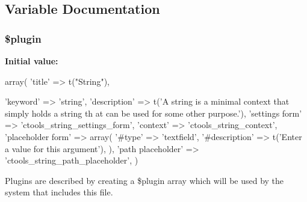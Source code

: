\subsection{Variable Documentation}
\hypertarget{arguments_2string_8inc_ada8a7130088351710bb02ed622d6bf65}{
\subsubsection[{\$plugin}]{\setlength{\rightskip}{0pt plus 5cm}\$plugin}}
\label{arguments_2string_8inc_ada8a7130088351710bb02ed622d6bf65}
{\bfseries Initial value:}
\begin{DoxyCode}
 array(
  'title' => t("String"),
  
  'keyword' => 'string',
  'description' => t('A string is a minimal context that simply holds a string th
      at can be used for some other purpose.'),
  'settings form' => 'ctools_string_settings_form',
  'context' => 'ctools_string_context',
  'placeholder form' => array(
    '#type' => 'textfield',
    '#description' => t('Enter a value for this argument'),
  ),
  'path placeholder' => 'ctools_string_path_placeholder', 
)
\end{DoxyCode}
Plugins are described by creating a \$plugin array which will be used by the system that includes this file. 